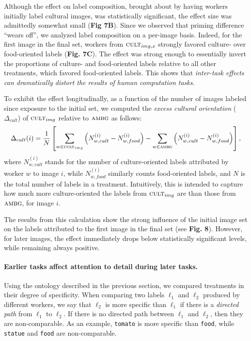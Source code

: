 \documentclass[a4paper]{report}
\begin{document}
Although the effect on label composition, brought about by having workers 
initially label cultural images, was statistically significant, the effect 
size was admittedly somewhat small (\textbf{Fig 7B}). Since we observed that 
priming 
difference ``wears off'', we analyzed label composition on a per-image basis.
Indeed, for the first image in the final set, workers from 
$\textsc{cult}_{img,x}$ strongly favored culture- over 
food-oriented labels (\textbf{Fig. 7C}). The effect was strong enough to 
essentially invert the proportions of culture- and food-oriented labels 
relative to all other treatments, which favored food-oriented labels.  
This shows that \textit{inter-task effects can dramatically distort the results
of human computation tasks}.

To exhibit the effect longitudinally, as a function of the number of images
labeled since exposure to the initial set, we computed the 
\textit{excess cultural orientation} 
($\Delta_{cult}$) of
$\textsc{cult}_{img}$ relative to $\textsc{ambg}$ as follows: 
\begin{align}
	\Delta_{cult}(i) = \frac{1}{N}\left[ \sum_{w\in\textsc{cult}_{img}} \left(N_{w,cult}^{(i)} - N_{w,food}^{(i)}\right)
	- \sum_{w\in\textsc{ambg}} \left(N_{w,cult}^{(i)} - N_{w,food}^{(i)}\right)\right],
\end{align}
where $N_{w,cult}^{(i)}$ stands for the number of culture-oriented labels 
attributed by worker $w$ to image $i$, while $N_{w,food}^{(i)}$ similarly 
counts food-oriented labels, and $N$ is the total number of labels in a 
treatment.  
Intuitively, this is intended to capture how much 
more culture-oriented the labels from $\textsc{cult}_{img}$ are than those
from $\textsc{ambg}$, for image $i$.

The results from this calculation show the strong influence of the 
initial image set on the labels attributed to the first image in the final set
(see \textbf{Fig. 8}).  However, for later images, the effect immediately 
drops below statistically significant levels, while remaining always positive.

\paragraph{Earlier tasks affect attention to detail during later tasks.} 
Using the ontology described
in the previous section, we compared treatments in their degree of specificity.
When comparing two labels $\ell_1$ and $\ell_2$ produced by different workers,
we say that $\ell_2$ is more specific than $\ell_1$ if there is a 
\textit{directed path} from $\ell_1$ to $\ell_2$.  If there is no directed path
between $\ell_1$ and $\ell_2$, then they are non-comparable.  As an example,
\texttt{tomato} is more specific than \texttt{food}, while \texttt{statue}
and \texttt{food} are non-comparable.
\end{document}
